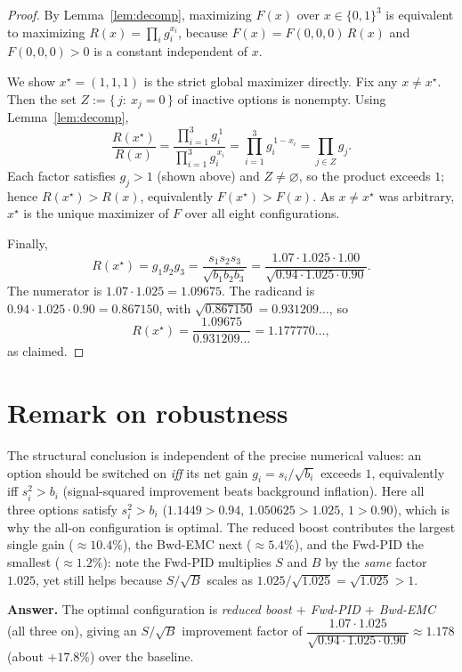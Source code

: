 \documentclass{amsart}
\begin{document}
\begin{proof}
By Lemma~\ref{lem:decomp}, maximizing $F(x)$ over $x\in\{0,1\}^3$ is
equivalent to maximizing $R(x)=\prod_{i}g_i^{x_i}$, because
$F(x)=F(0,0,0)\,R(x)$ and $F(0,0,0)>0$ is a constant independent of $x$.

We show $x^\star=(1,1,1)$ is the strict global maximizer directly. Fix any
$x\neq x^\star$. Then the set $Z:=\{\,j:\ x_j=0\,\}$ of inactive options is
nonempty. Using Lemma~\ref{lem:decomp},
\[
\frac{R(x^\star)}{R(x)}
=\frac{\prod_{i=1}^3 g_i^{\,1}}{\prod_{i=1}^3 g_i^{\,x_i}}
=\prod_{i=1}^3 g_i^{\,1-x_i}
=\prod_{j\in Z} g_j .
\]
Each factor satisfies $g_j>1$ (shown above) and $Z\neq\varnothing$, so the
product exceeds $1$; hence $R(x^\star)>R(x)$, equivalently $F(x^\star)>F(x)$.
As $x\neq x^\star$ was arbitrary, $x^\star$ is the unique maximizer of $F$ over
all eight configurations.

Finally,
\[
R(x^\star)=g_1g_2g_3=\frac{s_1 s_2 s_3}{\sqrt{b_1 b_2 b_3}}
=\frac{1.07\cdot 1.025\cdot 1.00}{\sqrt{0.94\cdot 1.025\cdot 0.90}}.
\]
The numerator is $1.07\cdot1.025=1.09675$. The radicand is
$0.94\cdot1.025\cdot0.90=0.867150$, with $\sqrt{0.867150}=0.931209\ldots$, so
\[
R(x^\star)=\frac{1.09675}{0.931209\ldots}=1.177770\ldots,
\]
as claimed.
\end{proof}

\section*{Remark on robustness}

The structural conclusion is independent of the precise numerical values: an
option should be switched on \emph{iff} its net gain $g_i=s_i/\sqrt{b_i}$
exceeds $1$, equivalently iff $s_i^2>b_i$ (signal-squared improvement beats
background inflation). Here all three options satisfy $s_i^2>b_i$
($1.1449>0.94$, $1.050625>1.025$, $1>0.90$), which is why the all-on
configuration is optimal. The reduced boost contributes the largest single
gain ($\approx 10.4\%$), the Bwd-EMC next ($\approx 5.4\%$), and the Fwd-PID
the smallest ($\approx 1.2\%$): note the Fwd-PID multiplies $S$ and $B$ by the
\emph{same} factor $1.025$, yet still helps because $S/\sqrt B$ scales as
$1.025/\sqrt{1.025}=\sqrt{1.025}>1$.

\medskip
\noindent\textbf{Answer.} The optimal configuration is
\emph{reduced boost $+$ Fwd-PID $+$ Bwd-EMC} (all three on), giving an
$S/\sqrt B$ improvement factor of
$\dfrac{1.07\cdot1.025}{\sqrt{0.94\cdot1.025\cdot0.90}}\approx 1.178$
(about $+17.8\%$) over the baseline.
\end{document}
